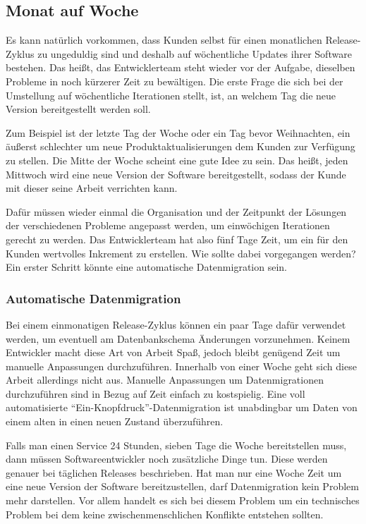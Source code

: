 \subsection{Monat auf Woche}
\label{subsec:monat-auf-woche}

Es kann natürlich vorkommen, dass Kunden selbst für einen monatlichen Release-Zyklus zu ungeduldig sind und deshalb auf wöchentliche Updates ihrer Software bestehen. Das heißt, das Entwicklerteam steht wieder vor der Aufgabe, dieselben Probleme in noch kürzerer Zeit zu bewältigen. Die erste Frage die sich bei der Umstellung auf wöchentliche Iterationen stellt, ist, an welchem Tag die neue Version bereitgestellt werden soll.

Zum Beispiel ist der letzte Tag der Woche oder ein Tag bevor Weihnachten, ein äußerst schlechter um neue Produktaktualisierungen dem Kunden zur Verfügung zu stellen. Die Mitte der Woche scheint eine gute Idee zu sein. Das heißt, jeden Mittwoch wird eine neue Version der Software bereitgestellt, sodass der Kunde mit dieser seine Arbeit verrichten kann. 

Dafür müssen wieder einmal die Organisation und der Zeitpunkt der Lösungen der verschiedenen Probleme angepasst werden, um einwöchigen Iterationen gerecht zu werden. Das Entwicklerteam hat also fünf Tage Zeit, um ein für den Kunden wertvolles Inkrement zu erstellen. Wie sollte dabei vorgegangen werden? Ein erster Schritt könnte eine automatische Datenmigration sein.

\subsubsection{Automatische Datenmigration}

Bei einem einmonatigen Release-Zyklus können ein paar Tage dafür verwendet werden, um eventuell am Datenbankschema Änderungen vorzunehmen. Keinem Entwickler macht diese Art von Arbeit Spaß, jedoch bleibt genügend Zeit um manuelle Anpassungen durchzuführen. Innerhalb von einer Woche geht sich diese Arbeit allerdings nicht aus. Manuelle Anpassungen um Datenmigrationen durchzuführen sind in Bezug auf Zeit einfach zu kostspielig. Eine voll automatisierte \enquote{Ein-Knopfdruck}-Datenmigration ist unabdingbar um Daten von einem alten in einen neuen Zustand überzuführen. 

Falls man einen Service 24 Stunden, sieben Tage die Woche bereitstellen muss, dann müssen Softwareentwickler noch zusätzliche Dinge tun. Diese werden genauer bei täglichen Releases beschrieben. Hat man nur eine Woche Zeit um eine neue Version der Software bereitzustellen, darf Datenmigration kein Problem mehr darstellen. Vor allem handelt es sich bei diesem Problem  um ein  technisches Problem bei dem keine zwischenmenschlichen Konflikte entstehen sollten. 

